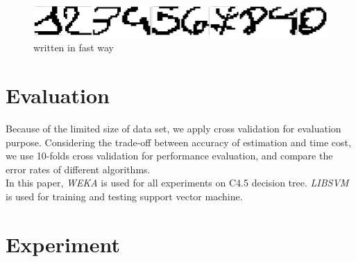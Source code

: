 \documentclass[a4paper,11pt]{article}
\begin{document}
\begin{figure}
\centering
\includegraphics[width=1.0\textwidth]{unclear}
\caption{written in fast way}
\end{figure}

\section{Evaluation}

Because of the limited size of data set, we apply cross validation for evaluation purpose. Considering the trade-off between accuracy of estimation and time cost, we use 10-folds cross validation for performance evaluation, and compare the error rates of different algorithms.\\
In this paper, \emph{WEKA}\cite{weka} is used for all experiments on C4.5 decision tree. \emph{LIBSVM}\cite{libsvm} is used for training and testing support vector machine.\\
\section{Experiment}
\end{document}
